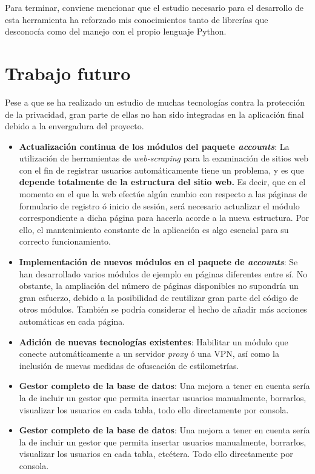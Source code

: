 Para terminar, conviene mencionar que el estudio necesario para el desarrollo de esta herramienta ha reforzado mis conocimientos tanto de librerías que desconocía como del manejo con el propio lenguaje Python. 

\section{Trabajo futuro}

Pese a que se ha realizado un estudio de muchas tecnologías contra la protección de la privacidad, gran parte de ellas no han sido integradas en la aplicación final debido a la envergadura del proyecto.

\begin{itemize}
	\item \textbf{Actualización continua de los módulos del paquete \textit{accounts}}: La utilización de herramientas de \textit{web-scraping} para la examinación de sitios web con el fin de registrar usuarios automáticamente tiene un problema, y es que \textbf{depende totalmente de la estructura del sitio web.} Es decir, que en el momento en el que la web efectúe algún cambio con respecto a las páginas de formulario de registro ó inicio de sesión, será necesario actualizar el módulo correspondiente a dicha página para hacerla acorde a la nueva estructura. Por ello, el mantenimiento constante de la aplicación es algo esencial para su correcto funcionamiento.
	\item \textbf{Implementación de nuevos módulos en el paquete de \textit{accounts}}: Se han desarrollado varios módulos de ejemplo en páginas diferentes entre sí. No obstante, la ampliación del número de páginas disponibles no supondría un gran esfuerzo, debido a la posibilidad de reutilizar gran parte del código de otros módulos. También se podría considerar el hecho de añadir más acciones automáticas en cada página.
	\item \textbf{Adición de nuevas tecnologías existentes}: Habilitar un módulo que conecte automáticamente a un servidor \textit{proxy} ó una VPN, así como la inclusión de nuevas medidas de ofuscación de estilometrías.
	\item \textbf{Gestor completo de la base de datos}: Una mejora a tener en cuenta sería la de incluir un gestor que permita insertar usuarios manualmente, borrarlos, visualizar los usuarios en cada tabla, todo ello directamente por consola.
	\item \textbf{Gestor completo de la base de datos}: Una mejora a tener en cuenta sería la de incluir un gestor que permita insertar usuarios manualmente, borrarlos, visualizar los usuarios en cada tabla, etcétera. Todo ello directamente por consola.	

\end{itemize}
